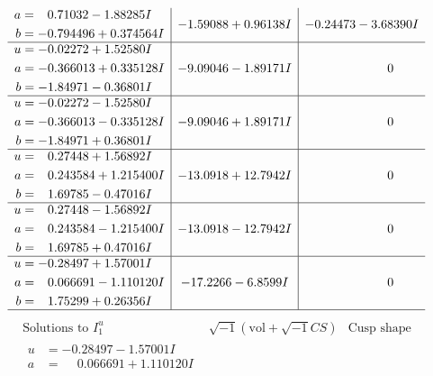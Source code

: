 \documentclass[1p]{elsarticle_modified}
\theoremstyle{definition}
\newcommand{\I}{\sqrt{-1}}
\begin{document}
$$\begin{array}{c|c|c}
\begin{aligned}
a &= \phantom{-}0.71032 - 1.88285 I \\
b &= -0.794496 + 0.374564 I\end{aligned}
 & -1.59088 + 0.96138 I & -0.24473 - 3.68390 I \\ \hline\begin{aligned}
u &= -0.02272 + 1.52580 I \\
a &= -0.366013 + 0.335128 I \\
b &= -1.84971 - 0.36801 I\end{aligned}
 & -9.09046 - 1.89171 I & \phantom{-0.000000 } 0 \\ \hline\begin{aligned}
u &= -0.02272 - 1.52580 I \\
a &= -0.366013 - 0.335128 I \\
b &= -1.84971 + 0.36801 I\end{aligned}
 & -9.09046 + 1.89171 I & \phantom{-0.000000 } 0 \\ \hline\begin{aligned}
u &= \phantom{-}0.27448 + 1.56892 I \\
a &= \phantom{-}0.243584 + 1.215400 I \\
b &= \phantom{-}1.69785 - 0.47016 I\end{aligned}
 & -13.0918 + 12.7942 I & \phantom{-0.000000 } 0 \\ \hline\begin{aligned}
u &= \phantom{-}0.27448 - 1.56892 I \\
a &= \phantom{-}0.243584 - 1.215400 I \\
b &= \phantom{-}1.69785 + 0.47016 I\end{aligned}
 & -13.0918 - 12.7942 I & \phantom{-0.000000 } 0 \\ \hline\begin{aligned}
u &= -0.28497 + 1.57001 I \\
a &= \phantom{-}0.066691 - 1.110120 I \\
b &= \phantom{-}1.75299 + 0.26356 I\end{aligned}
 & -17.2266 - 6.8599 I & \phantom{-0.000000 } 0\\
 \hline 
 \end{array}$$\newpage$$\begin{array}{c|c|c}  
\text{Solutions to }I^u_{1}& \I (\text{vol} + \sqrt{-1}CS) & \text{Cusp shape}\\
 \hline 
\begin{aligned}
u &= -0.28497 - 1.57001 I \\
a &= \phantom{-}0.066691 + 1.110120 I \\

\end{aligned}
\end{array}$$
\end{document}
